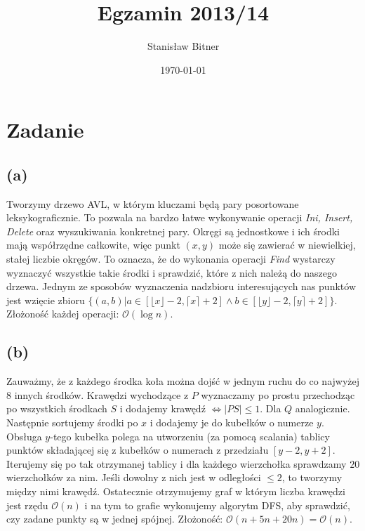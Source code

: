 \documentclass[12pt, a4paper]{article}
\title{Egzamin 2013/14}
\author{Stanisław Bitner}
\date{\today}
\newcommand{\MCALO}{\mathcal{O}}
\newcounter{zadanie}
\newcommand{\zadanie}{\addtocounter{zadanie}{1}\section*{Zadanie \arabic{zadanie}}}
\begin{document}
\maketitle
\zadanie{}
\subsection*{(a)}
Tworzymy drzewo AVL, w którym kluczami będą pary posortowane leksykograficznie.
To pozwala na bardzo łatwe wykonywanie operacji \textit{Ini, Insert, Delete}
oraz wyszukiwania konkretnej pary. Okręgi są jednostkowe i ich środki mają
współrzędne całkowite, więc punkt $(x,y)$ może się zawierać w niewielkiej,
stałej liczbie okręgów. To oznacza, że do wykonania operacji \textit{Find}
wystarczy wyznaczyć wszystkie takie środki i sprawdzić, które z nich należą do
naszego drzewa. Jednym ze sposobów wyznaczenia nadzbioru interesujących nas
punktów jest wzięcie zbioru
$\{(a,b) | a\in[\lfloor x \rfloor - 2, \lceil x \rceil + 2] \land
           b\in[\lfloor y \rfloor - 2, \lceil y \rceil + 2]\}$.
Złożoność każdej operacji: $\MCALO(\log{n})$.

\subsection*{(b)}
Zauważmy, że z każdego środka koła można dojść w jednym ruchu do co najwyżej
$8$ innych środków. Krawędzi wychodzące z $P$ wyznaczamy po prostu przechodząc
po wszystkich środkach $S$ i dodajemy krawędź $\iff |PS| \le 1$. Dla $Q$
analogicznie. Następnie sortujemy środki po $x$ i dodajemy je do kubełków
o numerze $y$. Obsługa $y$-tego kubełka polega na utworzeniu (za pomocą
scalania) tablicy punktów składającej się z kubełków o numerach z przedziału
$[y-2,y+2]$. Iterujemy się po tak otrzymanej tablicy i dla każdego wierzchołka
sprawdzamy $20$ wierzchołków za nim. Jeśli dowolny z nich jest w odległości
$\le 2$, to tworzymy między nimi krawędź. Ostatecznie otrzymujemy graf w którym
liczba krawędzi jest rzędu $\MCALO(n)$ i na tym to grafie wykonujemy algorytm
DFS, aby sprawdzić, czy zadane punkty są w jednej spójnej.
Złożoność: $\MCALO(n + 5n + 20n) = \MCALO(n)$.
\end{document}
